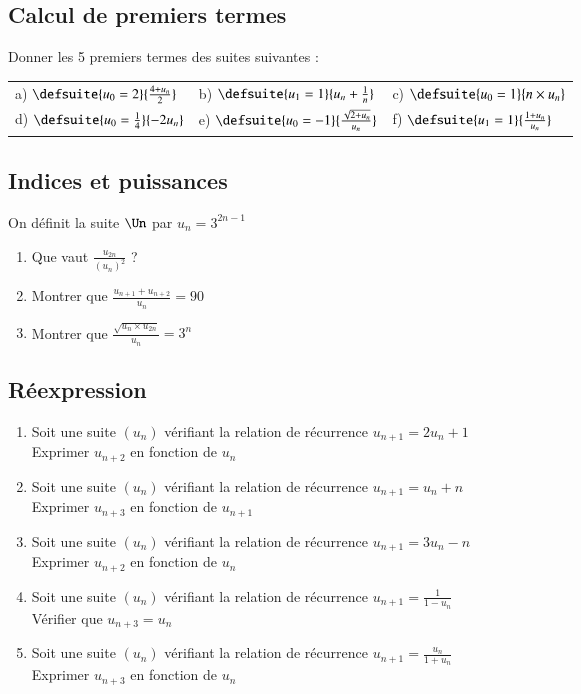 \documentclass[oneside,12pt]{article}          %
\begin{document}
\subsection{Calcul de premiers termes}
Donner les 5 premiers termes des suites suivantes :\\
\renewcommand{\arraystretch}{2}
\begin{tabular}{p{} p{} p{}}

    a) $\defsuite{u_{0} = 2}{\frac{4+u_{n}}{2}} $
    &
    b) $\defsuite{u_{1} = 1}{u_n+\frac{1}{n}} $
    &
    c) $\defsuite{u_{0} = 1}{n\times u_n} $ \\

    d) $\defsuite{u_{0} = \frac{1}{4}}{-2u_n} $
    &
    e) $\defsuite{u_{0} = -1}{\frac{\sqrt{2+u_n}}{u_n}} $
    &
    f) $\defsuite{u_{1}=1}{\frac{1+u_{n}}{u_{n}}}$ 
\end{tabular}



\subsection{Indices et puissances}
On définit la suite $\Un$ par $u_n=3^{2n-1}$
\begin{enumerate}
	\item Que vaut $\frac{u_{2n}}{(u_n)^2}$ ?
	\item Montrer que $\frac{u_{n+1}+u_{n+2}}{u_n}=90$
	\item Montrer que $\frac{\sqrt{u_n\times u_{2n}}}{u_n}=3^n$
\end{enumerate}


\subsection{Réexpression}
\begin{enumerate}
    \item Soit une suite $(u_n)$ vérifiant la relation de récurrence $u_{n+1} = 2u_n + 1$\\
    Exprimer $u_{n+2}$ en fonction de $u_n$
    \item Soit une suite $(u_n)$ vérifiant la relation de récurrence  $u_{n+1} = u_n + n$    \\
    Exprimer $u_{n+3}$ en fonction de $u_{n+1}$
    \item Soit une suite $(u_n)$ vérifiant la relation de récurrence  $u_{n+1} = 3u_n - n$    \\
    Exprimer $u_{n+2}$ en fonction de $u_n$
    \item Soit une suite $(u_n)$ vérifiant la relation de récurrence  $u_{n+1} = \frac{1}{1-u_n}$\\
    Vérifier que $u_{n+3}=u_n$
    \item Soit une suite $(u_n)$ vérifiant la relation de récurrence $u_{n+1}=\frac{u_n}{1+u_n}$\\
    Exprimer $u_{n+3}$ en fonction de $u_n$
\end{enumerate}
\end{document}
